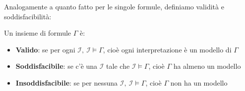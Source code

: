 Analogamente a quanto fatto per le singole formule, definiamo validità e soddisfacibilità: \smallskip\\
 \colorbox{SALZO}{\parbox{\dimexpr\linewidth-2\fboxsep}{\begin{definition}
   Un insieme di formule $\Gamma$ è:
   \begin{itemize}
    \item \textbf{Valido}: se per ogni $\mathcal{I},\ \mathcal{I} \models \Gamma$, cioè ogni interpretazione è un modello di $\Gamma$
    \item \textbf{Soddisfacibile}: se c'è una $\mathcal{I}$ tale che $\mathcal{I}\models \Gamma$, cioè $\Gamma$ ha almeno un modello 
    \item \textbf{Insoddisfacibile}: se per nessuna $\mathcal{I},\ \mathcal{I}\models \Gamma$, cioè $\Gamma$ non ha un modello
   \end{itemize}
\end{definition}}}



